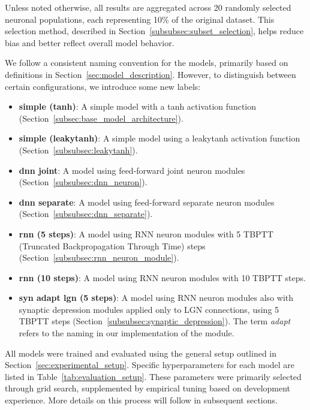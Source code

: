 Unless noted otherwise, all results are aggregated across 20 randomly selected neuronal populations, each representing 10\% of the original dataset. This selection method, described in Section~\ref{subsubsec:subset_selection}, helps reduce bias and better reflect overall model behavior.

We follow a consistent naming convention for the models, primarily based on definitions in Section~\ref{sec:model_description}. However, to distinguish between certain configurations, we introduce some new labels:

\begin{itemize}
    \item \textbf{simple (tanh)}: A simple model with a tanh activation function (Section~\ref{subsec:base_model_architecture}).
    \item \textbf{simple (leakytanh)}: A simple model using a leakytanh activation function (Section~\ref{subsubsec:leakytanh}).
    \item \textbf{dnn joint}: A model using feed-forward joint neuron modules (Section~\ref{subsubsec:dnn_neuron}).
    \item \textbf{dnn separate}: A model using feed-forward separate neuron modules  (Section~\ref{subsubsec:dnn_separate}).
    \item \textbf{rnn (5 steps)}: A model using RNN neuron modules with 5 TBPTT (Truncated Backpropagation Through Time) steps (Section~\ref{subsubsec:rnn_neuron_module}).
    \item \textbf{rnn (10 steps)}: A model using RNN neuron modules with 10 TBPTT steps.
    \item \textbf{syn adapt lgn (5 steps)}: A model using RNN neuron modules also with synaptic depression modules applied only to LGN connections, using 5 TBPTT steps (Section~\ref{subsubsec:synaptic_depression}). The term \textit{adapt} refers to the naming in our implementation of the module.
\end{itemize}

All models were trained and evaluated using the general setup outlined in Section~\ref{sec:experimental_setup}. Specific hyperparameters for each model are listed in Table~\ref{tab:evaluation_setup}. These parameters were primarily selected through grid search, supplemented by empirical tuning based on development experience. More details on this process will follow in subsequent sections.


